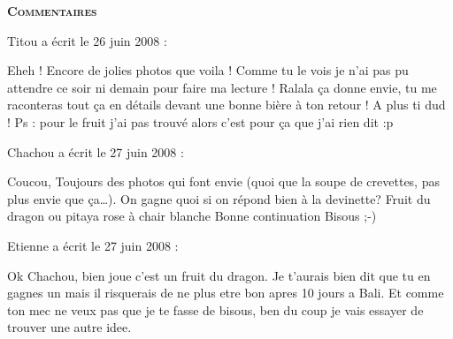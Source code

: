 \bigskip
\textbf{\textsc{Commentaires}}

\medskip
Titou a écrit le 26 juin 2008 :
\begin{displayquote}
Eheh ! Encore de jolies photos que voila ! Comme tu le vois je n'ai pas pu attendre ce soir ni demain pour faire ma lecture !
Ralala ça donne envie, tu me raconteras tout ça en détails devant une bonne bière à ton retour !
A plus ti dud !
Ps : pour le fruit j'ai pas trouvé alors c'est pour ça que j'ai rien dit :p
\end{displayquote}

\medskip
Chachou a écrit le 27 juin 2008 :
\begin{displayquote}
Coucou,
Toujours des photos qui font envie (quoi que la soupe de crevettes, pas plus envie que ça\dots).
On gagne quoi si on répond bien à la devinette?
Fruit du dragon ou pitaya rose à chair blanche
Bonne continuation
Bisous ;-)
\end{displayquote}

\medskip
Etienne a écrit le 27 juin 2008 :
\begin{displayquote}
Ok Chachou, bien joue c'est un fruit du dragon. Je t'aurais bien dit que tu en gagnes un mais il risquerais de ne plus etre bon apres 10 jours a Bali. Et comme ton mec ne veux pas que je te fasse de bisous, ben du coup je vais essayer de trouver une autre idee.
\end{displayquote}

\vfill

